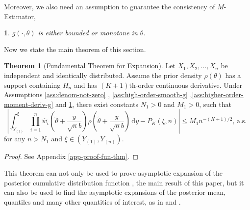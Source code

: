 \documentclass[oneside,english]{amsbook}
\numberwithin{section}{chapter}
\numberwithin{equation}{section}
\numberwithin{figure}{section}
\theoremstyle{plain}
\theoremstyle{plain}
\newtheorem{assumption}{\protect\assumptionname}
\theoremstyle{definition}
\theoremstyle{plain}
\theoremstyle{plain}
\theoremstyle{remark}
\theoremstyle{definition}
\newtheorem{theorem}{Theorem}
\theoremstyle{definition}
\newcommand{\diff}{\,\mathrm{d}}
\newcommand{\ascv}{\,\mathrm{a.s.}\,}
\providecommand{\assumptionname}{Assumption}
\begin{document}
Moreover, we also need an assumption to guarantee the consistency of $M$-Estimator,
\begin{assumption}
\label{ass:m-est-consistency}
$g\left(\cdot,\theta\right)$ is either bounded or monotone in $\theta$.
\end{assumption} 
Now we state the main theorem of this section.
\begin{theorem}[Fundamental Theorem for Expansion]
\label{thm:main-thm}Let $X_{1},X_{2},\ldots,X_{n}$ be independent and identically distributed.   %
Assume the prior density $\rho\left(\theta\right)$ has a support containing
$H_n$ and has $\left(K+1\right)$th-order continuous derivative. Under Assumptions \ref{ass:denom-not-zero} , \ref{ass:high-order-smooth-g} ,\ref{ass:higher-order-moment-deriv-g} and \ref{ass:m-est-consistency},  there
exist constants $N_{1}>0$ and $M_{1}>0$, such that 
\begin{equation}
\left|\int_{Y_{\left(1\right)}}^{\xi}\prod_{i=1}^{n}\hat{w}_{i}\left(\tilde{\theta}+\frac{y}{\sqrt{n}b}\right)\rho\left(\tilde{\theta}+\frac{y}{\sqrt{n}b}\right)\diff y-P_{K}\left(\xi,n\right)\right|\le M_{1}n^{-\left(K+1\right)/2},\ascv\label{eq:fund-exp-formula}
\end{equation}
for any $n>N_{1}$ and $\xi\in\left(Y_{\left(1\right)},Y_{\left(n\right)}\right)$. \end{theorem}
\begin{proof}
See Appendix \ref{app-proof-fun-thm}.
\end{proof}
This theorem can not only be used to prove asymptotic expansion of
the posterior cumulative distribution function , the main result of this
paper, but it can also be used to find the asymptotic expansions of the
posterior mean, quantiles and many other quantities of interest, as in \cite{johnson1970asymptotic}
and \cite{vexler2014posterior} . 
\end{document}
